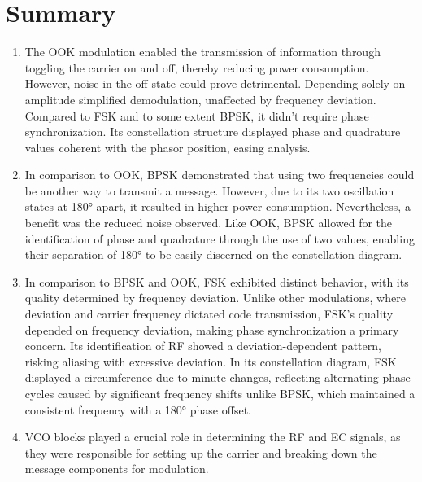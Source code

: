 \documentclass{journal}[IEEEtran, twocolumn]             %
\begin{document}
\begin{multicols}{2}
\begin{enumerate}[label=\Alph*]
\end{enumerate}

\section{Summary}

\begin{enumerate}
 \item The OOK modulation enabled the transmission of information through toggling the carrier on and off, thereby reducing power consumption. However, noise in the off state could prove detrimental. Depending solely on amplitude simplified demodulation, unaffected by frequency deviation. Compared to FSK and to some extent BPSK, it didn't require phase synchronization. Its constellation structure displayed phase and quadrature values coherent with the phasor position, easing analysis.

 \item In comparison to OOK, BPSK demonstrated that using two frequencies could be another way to transmit a message. However, due to its two oscillation states at 180° apart, it resulted in higher power consumption. Nevertheless, a benefit was the reduced noise observed. Like OOK, BPSK allowed for the identification of phase and quadrature through the use of two values, enabling their separation of 180° to be easily discerned on the constellation diagram.

 \item In comparison to BPSK and OOK, FSK exhibited distinct behavior, with its quality determined by frequency deviation. Unlike other modulations, where deviation and carrier frequency dictated code transmission, FSK's quality depended on frequency deviation, making phase synchronization a primary concern. Its identification of RF showed a deviation-dependent pattern, risking aliasing with excessive deviation. In its constellation diagram, FSK displayed a circumference due to minute changes, reflecting alternating phase cycles caused by significant frequency shifts unlike BPSK, which maintained a consistent frequency with a 180° phase offset.

 \item VCO blocks played a crucial role in determining the RF and EC signals, as they were responsible for setting up the carrier and breaking down the message components for modulation.
 
\end{enumerate}


\nocite{*}

\end{multicols}
\end{document}
